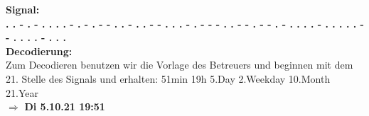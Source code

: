 \textbf{Signal:}\\
\textbf{. . - . - . . . . - 
        . - . - - . . - . . 
        - - . . . - . - - - 
        . . - - . - - . - . 
        . . . - . . . . . - 
        - . . . . - . . . }\\
\textbf{Decodierung:}\\
Zum Decodieren benutzen wir die Vorlage des Betreuers und beginnen mit dem 21. Stelle des Signals und erhalten: 51min 19h 5.Day 2.Weekday 10.Month 21.Year \\$\Rightarrow$ \textbf{Di 5.10.21 19:51}